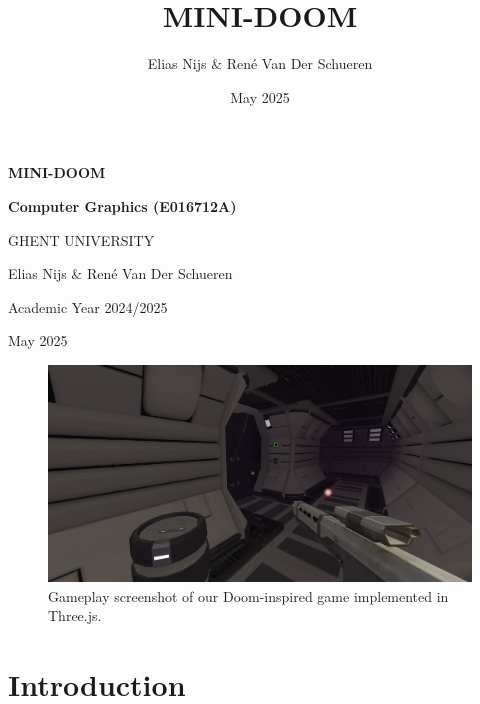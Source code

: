 \documentclass{article}
\title{MINI-DOOM}
\author{Elias Nijs \& René Van Der Schueren}
\date{May 2025}
\newcommand{\courseinfo}{Computer Graphics (E016712A)}
\newcommand{\academicyear}{Academic Year 2024/2025}
\newcommand{\university}{GHENT UNIVERSITY}
\begin{document}
\begin{titlepage}
    \centering
    \vspace*{1cm}

    \Huge
    \textbf{MINI-DOOM}\\
    \vspace{1.5cm}

    \Large
    \textbf{\courseinfo}\\
    \vspace{0.5cm}

    \large
    \university\\
    \vspace{0.5cm}

    \vspace{1.5cm}

    \Large
    Elias Nijs \& René Van Der Schueren\\
    \vspace{0.5cm}

    \large
    \academicyear\\
    \vspace{0.5cm}

    \large
    May 2025\\

\end{titlepage}

\pagebreak

\tableofcontents

\pagebreak

\begin{figure}[H]
    \centering
    \includegraphics[width=\textwidth]{diagrams/gameplay.png}
    \caption{Gameplay screenshot of our Doom-inspired game implemented in Three.js.}
    \label{fig:gameplay-main}
\end{figure}

\section{Introduction}\label{sec:introduction}
\end{document}
